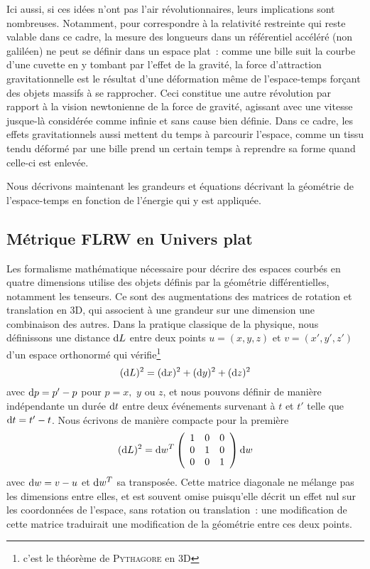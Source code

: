 \documentclass[../main/main.tex]{subfiles}
\begin{document}
Ici aussi, si ces idées n'ont pas l'air révolutionnaires, leurs implications
sont nombreuses. Notamment, pour correspondre à la relativité restreinte qui
reste valable dans ce cadre, la mesure des longueurs dans un référentiel
accéléré (non galiléen) ne peut se définir dans un espace plat~: comme une bille
suit la courbe d'une cuvette en y tombant par l'effet de la gravité, la force
d'attraction gravitationnelle est le résultat d'une déformation même de
l'espace-temps forçant des objets massifs à se rapprocher. Ceci constitue une
autre révolution par rapport à la vision newtonienne de la force de gravité,
agissant avec une vitesse jusque-là considérée comme infinie et sans cause bien
définie. Dans ce cadre, les effets gravitationnels aussi mettent du temps à
parcourir l'espace, comme un tissu tendu déformé par une bille prend un certain
temps à reprendre sa forme quand celle-ci est enlevée.

Nous décrivons maintenant les grandeurs et équations décrivant la géométrie de
l'espace-temps en fonction de l'énergie qui y est appliquée.

\subsection{Métrique FLRW en Univers plat}\label{ssec:cons}

Les formalisme mathématique nécessaire pour décrire des espaces courbés en
quatre dimensions utilise des objets définis par la géométrie différentielles,
notamment les tenseurs. Ce sont des augmentations des matrices de rotation et
translation en 3D, qui associent à une grandeur sur une dimension une
combinaison des autres. Dans la pratique classique de la physique, nous
définissons une distance $\mathrm{d} L$ entre deux points $u=(x,y,z)$ et $v=(x',y',z')$
d'un espace orthonormé qui vérifie\footnote{c'est le théorème de
\textsc{Pythagore} en 3D}
\begin{equation}
    (\mathrm{d} L)^2 = (\mathrm{d} x)^2 + (\mathrm{d} y)^2 + (\mathrm{d} z)^2
\end{equation}
avec $\mathrm{d} p = p'-p$ pour $p = x,$ $y$ ou $z$, et nous pouvons définir de manière
indépendante un durée $\mathrm{d} t$ entre deux événements survenant à $t$ et $t'$ telle
que $\mathrm{d} t = t'-t$. Nous écrivons de manière compacte pour la première
\begin{equation}
    (\mathrm{d} L)^2 = \mathrm{d} w^T\left(\begin{array}{c c c}
            1 & 0 & 0\\
            0 & 1 & 0\\
            0 & 0 & 1\\
    \end{array}\right)\mathrm{d} w
\end{equation}
avec $\mathrm{d} w = v-u$ et $\mathrm{d} w^T$ sa transposée. Cette matrice diagonale ne mélange
pas les dimensions entre elles, et est souvent omise puisqu'elle décrit un effet
nul sur les coordonnées de l'espace, sans rotation ou translation~: une
modification de cette matrice traduirait une modification de la géométrie entre
ces deux points.
\end{document}
